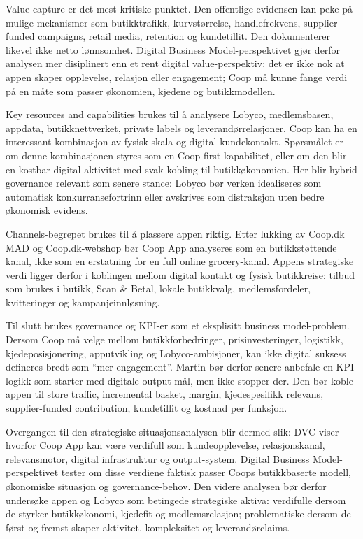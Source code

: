 \documentclass[12pt,a4paper]{article}
\begin{document}
Value capture er det mest kritiske punktet. Den offentlige evidensen kan peke på mulige mekanismer som butikktrafikk, kurvstørrelse, handlefrekvens, supplier-funded campaigns, retail media, retention og kundetillit. Den dokumenterer likevel ikke netto lønnsomhet. Digital Business Model-perspektivet gjør derfor analysen mer disiplinert enn et rent digital value-perspektiv: det er ikke nok at appen skaper opplevelse, relasjon eller engagement; Coop må kunne fange verdi på en måte som passer økonomien, kjedene og butikkmodellen.

Key resources and capabilities brukes til å analysere Lobyco, medlemsbasen, appdata, butikknettverket, private labels og leverandørrelasjoner. Coop kan ha en interessant kombinasjon av fysisk skala og digital kundekontakt. Spørsmålet er om denne kombinasjonen styres som en Coop-first kapabilitet, eller om den blir en kostbar digital aktivitet med svak kobling til butikkøkonomien. Her blir hybrid governance relevant som senere stance: Lobyco bør verken idealiseres som automatisk konkurransefortrinn eller avskrives som distraksjon uten bedre økonomisk evidens.

Channels-begrepet brukes til å plassere appen riktig. Etter lukking av Coop.dk MAD og Coop.dk-webshop bør Coop App analyseres som en butikkstøttende kanal, ikke som en erstatning for en full online grocery-kanal. Appens strategiske verdi ligger derfor i koblingen mellom digital kontakt og fysisk butikkreise: tilbud som brukes i butikk, Scan \& Betal, lokale butikkvalg, medlemsfordeler, kvitteringer og kampanjeinnløsning.

Til slutt brukes governance og KPI-er som et eksplisitt business model-problem. Dersom Coop må velge mellom butikkforbedringer, prisinvesteringer, logistikk, kjedeposisjonering, apputvikling og Lobyco-ambisjoner, kan ikke digital suksess defineres bredt som ``mer engagement''. Martin bør derfor senere anbefale en KPI-logikk som starter med digitale output-mål, men ikke stopper der. Den bør koble appen til store traffic, incremental basket, margin, kjedespesifikk relevans, supplier-funded contribution, kundetillit og kostnad per funksjon.

Overgangen til den strategiske situasjonsanalysen blir dermed slik: DVC viser hvorfor Coop App kan være verdifull som kundeopplevelse, relasjonskanal, relevansmotor, digital infrastruktur og output-system. Digital Business Model-perspektivet tester om disse verdiene faktisk passer Coops butikkbaserte modell, økonomiske situasjon og governance-behov. Den videre analysen bør derfor undersøke appen og Lobyco som betingede strategiske aktiva: verdifulle dersom de styrker butikkøkonomi, kjedefit og medlemsrelasjon; problematiske dersom de først og fremst skaper aktivitet, kompleksitet og leverandørclaims.
\end{document}
